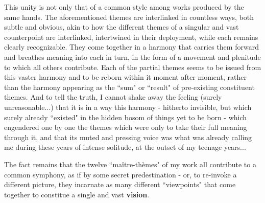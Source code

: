 This unity is not only that of a common style among works produced by the same hands. The aforementioned themes are interlinked in countless ways, both subtle and obvious, akin to how the different themes of a singular and vast counterpoint are interlinked, intertwined in their deployment, while each remains clearly recognizable. They come together in a harmony that carries them forward and breathes meaning into each in turn, in the form of a movement and plenitude to which all others contribute. Each of the partial themes seems to be issued from this vaster harmony and to be reborn within it moment after moment, rather than the harmony appearing as the ``sum" or ``result" of pre-existing constituent themes. And to tell the truth, I cannot shake away the feeling (surely unreasonable...) that it is in a way this harmony - hitherto invisible, but which surely already ``existed" in the hidden bosom of things yet to be born - which engendered one by one the themes which were only to take their full meaning through it, and that its muted and pressing voice was what was already calling me during these years of intense solitude, at the outset of my teenage years...

The fact remains that the twelve ``ma\^itre-th\`emes" of my work all contribute to a common symphony, as if by some secret predestination - or, to re-invoke a different picture, they incarnate as many different ``viewpoints" that come together to constitue a single and vast \textbf{vision}.


